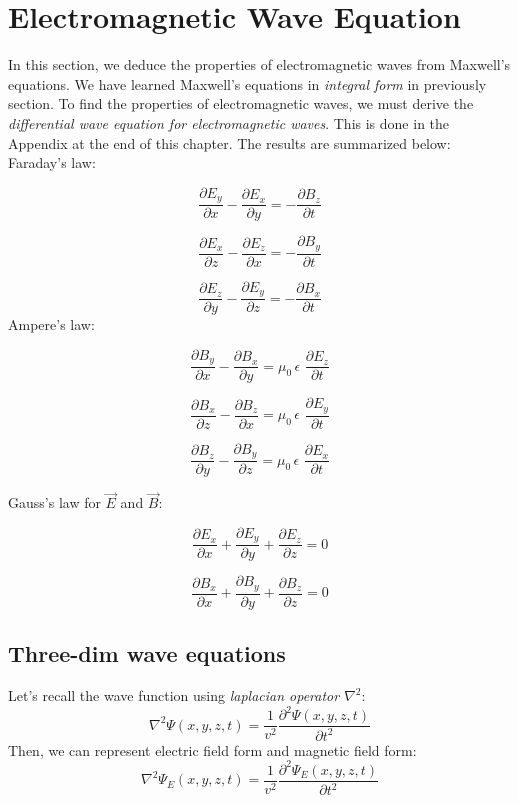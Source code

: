 \documentclass[12pt]{article}
\numberwithin{equation}{section}
\begin{document}
\section{Electromagnetic Wave Equation}
In this section, we deduce the properties of electromagnetic waves from Maxwell's equations.
We have learned Maxwell's equations in \emph{integral form} in previously section. To find the properties of
electromagnetic waves, we must derive the \emph{differential wave equation for electromagnetic waves}. This is done in the
Appendix at the end of this chapter. The results are summarized below:\\
\indent Faraday's law:

\[
    \frac{\partial{E_y}}{\partial{x}}-\frac{\partial{E_x}}{\partial{y}}=-\frac{\partial{B_z}}{\partial{t}}
\]

\[
    \frac{\partial{E_x}}{\partial{z}}-\frac{\partial{E_z}}{\partial{x}}=-\frac{\partial{B_y}}{\partial{t}}
\]

\[
    \frac{\partial{E_z}}{\partial{y}}-\frac{\partial{E_y}}{\partial{z}}=-\frac{\partial{B_x}}{\partial{t}}
\]
\indent Ampere's law:

\[
    \frac{\partial{B_y}}{\partial{x}}-\frac{\partial{B_x}}{\partial{y}}=\mu_0\,\epsilon\,\,\frac{\partial{E_z}}{\partial{t}}
\]

\[
    \frac{\partial{B_x}}{\partial{z}}-\frac{\partial{B_z}}{\partial{x}}=\mu_0\,\epsilon\,\,\frac{\partial{E_y}}{\partial{t}}
\]  

\[
    \frac{\partial{B_z}}{\partial{y}}-\frac{\partial{B_y}}{\partial{z}}=\mu_0\,\epsilon\,\,\frac{\partial{E_x}}{\partial{t}}
\]

\indent Gauss's law for $\vec{E}$ and $\vec{B}$:

\[
    \frac{\partial{E_x}}{\partial{x}}+\frac{\partial{E_y}}{\partial{y}}+\frac{\partial{E_z}}{\partial{z}}=0
\]

\[
    \frac{\partial{B_x}}{\partial{x}}+\frac{\partial{B_y}}{\partial{y}}+\frac{\partial{B_z}}{\partial{z}}=0
\]
\subsection{Three-dim wave equations}
Let's recall the wave function using \emph{laplacian operator $\nabla^2$}:
\[
    \nabla^2 \Psi(x,y,z,t)=\frac{1}{v^2}\frac{\partial^2{\Psi(x,y,z,t)}}{\partial{t^2}}
\]
Then, we can represent electric field form and magnetic field form:
\[
    \nabla^2 \Psi_E(x,y,z,t)=\frac{1}{v^2}\frac{\partial^2{\Psi_E(x,y,z,t)}}{\partial{t^2}}
\]
\end{document}
